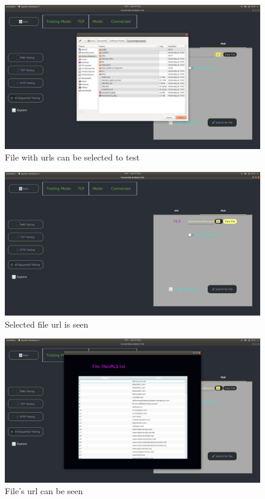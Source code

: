\begin{figure}[h]
    \centering
    \includegraphics[width=\textwidth]{usersite/26selectfiles.png}
    \caption{File with urls can be selected to test}
    \label{fig:user25}
\end{figure}


\begin{figure}[h]
    \centering
    \includegraphics[width=\textwidth]{usersite/27inputfile2.png}
    \caption{Selected file url is seen}
    \label{fig:user26}
\end{figure}

\begin{figure}[h]
    \centering
    \includegraphics[width=\textwidth]{usersite/28fileread.png}
    \caption{File's url can be seen}
    \label{fig:user27}
\end{figure}




